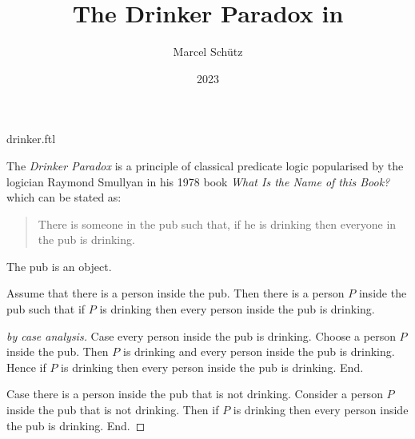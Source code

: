 \documentclass{stex}
\begin{document}
\title{The Drinker Paradox in \Naproche}
\author{Marcel Schütz}
\date{2023}
\maketitle
\begin{smodule}{drinker.ftl}

  \noindent The \emph{Drinker Paradox} is a principle of classical predicate logic popularised by the logician Raymond Smullyan in his 1978 book \textit{What Is the Name of this Book?} \cite{Smullyan1978} which can be stated as:

  \begin{quotation}
    \noindent There is someone in the pub such that, if he is drinking then everyone in the pub is drinking.
  \end{quotation}

  \begin{forthel}
    \begin{signature*}
      The pub is an object.
    \end{signature*}

    \begin{theorem*}\label{drinker_paradox}
      Assume that there is a person inside the pub.
      Then there is a person $P$ inside the pub such that if $P$ is drinking then every person inside the pub is drinking.
    \end{theorem*}
    \begin{proof}[ by case analysis]
      Case every person inside the pub is drinking.
        Choose a person $P$ inside the pub.
        Then $P$ is drinking and every person inside the pub is drinking.
        Hence if $P$ is drinking then every person inside the pub is drinking.
      End.

      Case there is a person inside the pub that is not drinking.
        Consider a person $P$ inside the pub that is not drinking.
        Then if $P$ is drinking then every person inside the pub is drinking.
      End.
    \end{proof}
  \end{forthel}
\end{smodule}
\printbibliography
\end{document}
